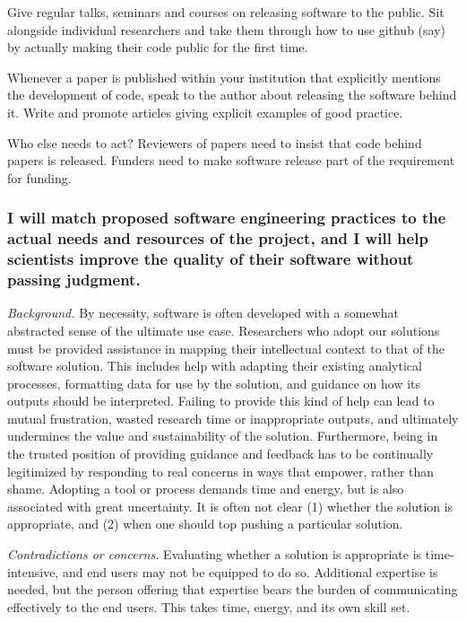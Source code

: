 \documentclass[a4paper,UKenglish]{dagman}
\renewcommand{\paragraph}[1]{\subsubsection*{#1}\xspace}
\begin{document}
Give regular talks, seminars and courses on releasing software to the public. 
Sit alongside individual researchers and take them through how to use github (say) by actually making their code public for the first time.

Whenever a paper is published within your institution that explicitly mentions the development of code, speak to the author about releasing the software behind it. Write and promote articles giving explicit examples of good practice.



Who else needs to act?
Reviewers of papers need to insist that code behind papers is released. Funders need to make software release part of the requirement for funding.

\paragraph{I will match proposed software engineering practices to the actual needs and resources of the project, and I will help scientists improve the quality of their software without passing judgment.}


\emph{Background.}
By necessity, software is often developed with a somewhat abstracted sense of the ultimate use case. Researchers who adopt our solutions must be provided assistance in mapping their intellectual context to that of the software solution. This includes help with adapting their existing analytical processes, formatting data for use by the solution, and guidance on how its outputs should be interpreted. Failing to provide this kind of help can lead to mutual frustration, wasted research time or inappropriate outputs, and ultimately undermines the value and sustainability of the solution. Furthermore, being in the trusted position of providing guidance and feedback has to be continually legitimized by responding to real concerns in ways that empower, rather than shame. Adopting a tool or process demands time and energy, but is also associated with great uncertainty. It is often not clear (1) whether the solution is appropriate, and (2) when one should top pushing a particular solution.

\emph{Contradictions or concerns.}
Evaluating whether a solution is appropriate is time-intensive, and end users may not be equipped to do so. Additional expertise is needed, but the person offering that expertise bears the burden of communicating effectively to the end users. This takes time, energy, and its own skill set.
\end{document}
